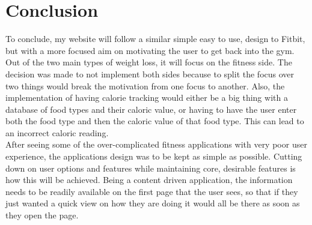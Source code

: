 \section{Conclusion}
To conclude, my website will follow a similar simple easy to use, design to Fitbit, but with a more focused aim on motivating the user to get back into the gym. Out of the two main types of weight loss, it will focus on the fitness side. The decision was made to not implement both sides because to split the focus over two things would break the motivation from one focus to another. Also, the implementation of having calorie tracking would either be a big thing with a database of food types and their caloric value, or having to have the user enter both the food type and then the caloric value of that food type. This can lead to an incorrect caloric reading.\\

After seeing some of the over-complicated fitness applications with very poor user experience, the applications design was to be kept as simple as possible. Cutting down on user options and features while maintaining core, desirable features is how this will be achieved. Being a content driven application, the information needs to be readily available on the first page that the user sees, so that if they just wanted a quick view on how they are doing it would all be there as soon as they open the page.
